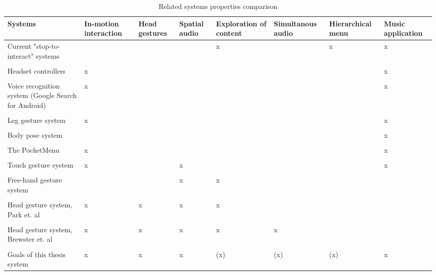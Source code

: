 \begin{table}[b] 
\scriptsize
\caption{Related systems properties comparison} %
\begin{tabular}{L{2.2cm}C{1.5cm}C{1.3cm}C{1.3cm}C{1.5cm}C{1.5cm}C{1.5cm}C{1.5cm}} \toprule
	Systems & In-motion interaction & Head gestures & Spatial audio & Exploration of content & Simultanous audio & Hierarchical menu & Music application \\ \midrule
    Current "stop-to-interact" systems   &  &  &  & x &  & x & x \\
    \\
    Headset controllers   & x &  &  &  &  &  & x \\
    \\
    Voice recognition system (Google Search for Android)   & x &  &  &  &  &  & x \\
    \\
	Leg gesture system \cite{smus_running_2010}   & x &  &  &  &  &  & x \\ %
	\\
	Body pose system \cite{strachan_bodyspace_2007}   &  &   &  &  &  &  & x \\
	\\
	The PocketMenu \cite{pielot_pocketmenu:_2012}   & x &  &  &  &  &  & x \\
	\\
	Touch gesture system \cite{pirhonen_gestural_2002}   & x &  & x &  &  &  & x \\
	\\
	Free-hand gesture system \cite{kajastila_eyes-free_2013}   &  &  & x & x &  &  &  \\
	\\
	Head gesture system, Park et. al \cite{park_gaze-directed_2011}   & x & x & x & x &  &  &  \\
	\\
	Head gesture system, Brewster et. al \cite{brewster_multimodal_2003}   & x & x & x & x & x &  &   \\
	\\
	Goals of this thesis system   & x & x & x & (x) & (x) & (x) & x \\ \bottomrule
\end{tabular}

\label{tab:related} 
\end{table}

